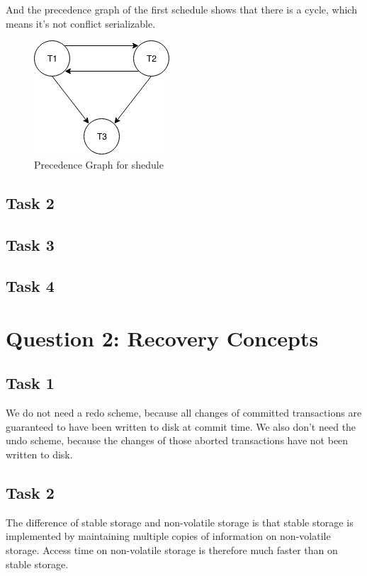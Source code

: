 \documentclass[12pt,a4paper]{article}
\begin{document}
And the precedence graph of the first schedule shows that there is a cycle, which means it's not conflict serializable.
\begin{figure}
	\center
	\includegraphics{img/Q1-task1}
	\caption{Precedence Graph for shedule}
\end{figure}

\subsection{Task 2}


\subsection{Task 3}


\subsection{Task 4}

\section{Question 2: Recovery Concepts}
\subsection{Task 1}
We do not need a redo scheme, because all changes of committed transactions are guaranteed to have been written to disk at commit time.
We also don't need the undo scheme, because the changes of those aborted transactions have not been written to disk.

\subsection{Task 2}
The difference of stable storage and non-volatile storage is that stable storage is implemented by maintaining multiple copies of information on non-volatile storage.
Access time on non-volatile storage is therefore much faster than on stable storage.
\end{document}
